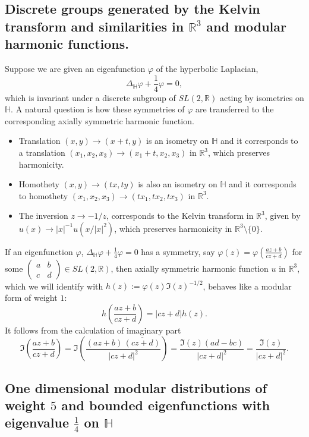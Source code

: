 \documentclass{article}
\newcommand{\R}{\mathbb{R}}
\newcommand{\Hh}{\mathbb{H}}
\begin{document}
\subsection*{Discrete groups generated by the Kelvin transform and similarities in $\mathbb{R}^3$ and modular harmonic functions.}
Suppose we are given an eigenfunction \(\varphi\) of the hyperbolic Laplacian,
\[
\Delta_{\mathbb H} \varphi + \frac{1}{4}\varphi = 0,
\]
which is invariant under a discrete subgroup of \(SL(2,\mathbb R)\) acting by
isometries on \(\mathbb H\). A natural question is how these symmetries of
\(\varphi\) are transferred to the corresponding axially symmetric harmonic
function.
\begin{itemize}
    \item Translation $(x,y) \to (x+t, y)$ is an isometry on $\Hh$ and it  corresponds to a translation $(x_1, x_2, x_3) \to (x_1+t, x_2, x_3)$ in $\R^3$, which preserves harmonicity.
    \item Homothety $(x,y) \to (tx, ty)$ is also an isometry on $\Hh$ and 
     it  corresponds to homothety $(x_1, x_2, x_3) \to (tx_1, tx_2, tx_3)$ in $\R^3$.
    \item The inversion $z \to {-1/z}$, corresponds to the Kelvin transform in $\R^3$, given by $u(x) \to |x|^{-1} u(x/|x|^2)$, which preserves harmonicity in $\mathbb{R}^3\setminus\{0\}$.
\end{itemize}
 If an eigenfunction $\varphi$, $\Delta_{\mathbb{H}}\varphi+\frac{1}{4}\varphi=0$ has a symmetry, say $\varphi(z)=\varphi\left(\frac{az+b}{cz+d}\right)$ for some $\begin{pmatrix}
a & b\\
c & d
\end{pmatrix}\in SL(2, \R)$, then axially symmetric harmonic function $u$ in $\mathbb{R}^3$, which we will identify with $h(z):=\varphi(z)\Im(z)^{-1/2}$, behaves like a modular form of weight $1$:
\begin{equation}
    h\left( \frac{az+b}{cz+d}\right)= |cz+d|h(z).
\end{equation}
It follows from the calculation of imaginary part
$$  \Im\!\left(\frac{az + b}{cz + d}\right)=\Im\!\left(\frac{(az + b)\,\overline{(cz + d)}}{|cz + d|^2}\right)= \frac{\Im(z)(ad-bc)}{|cz + d|^2}=\frac{\Im(z)}{|cz + d|^2}.$$
\subsection*{One dimensional modular distributions of weight $5$ and bounded eigenfunctions with eigenvalue $\frac14$ on $\mathbb{H}$}
\end{document}
